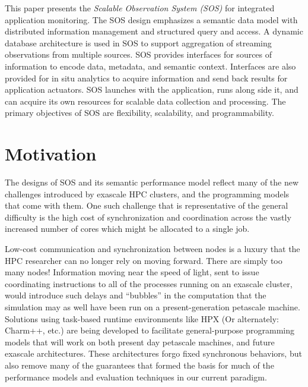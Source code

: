 This paper presents the \textit{Scalable Observation System (SOS)} for
integrated application monitoring.  The SOS design emphasizes a semantic
data model with distributed information management and structured query and
access.  A dynamic database architecture is used in SOS to support
aggregation of streaming observations from multiple sources.  SOS provides
interfaces for sources of information to encode data, metadata, and
semantic context.  Interfaces are also provided for in situ analytics to
acquire information and send back results for application actuators.  SOS
launches with the application, runs along side it, and can acquire its own
resources for scalable data collection and processing.  The primary
objectives of SOS are flexibility, scalability, and programmability.


\section{Motivation}

The designs of SOS and its semantic performance model reflect many of
the new challenges introduced by exascale HPC clusters, and the
programming models that come with them. One such challenge that is
representative of the general difficulty is the high cost of
synchronization and coordination across the vastly increased number of
cores which might be allocated to a single job.

Low-cost communication and synchronization between nodes is a luxury
that the HPC researcher can no longer rely on moving forward. There
are simply too many nodes! Information moving near the speed of light,
sent to issue coordinating instructions to all of the processes
running on an exascale cluster, would introduce such delays and
``bubbles'' in the computation that the simulation may as well have
been run on a present-generation petascale machine.  Solutions using
task-based runtime environments \cite{kaiser2014hpx} like HPX (Or
alternately: Charm++, etc.)  are being developed to facilitate
general-purpose programming models that will work on both present day
petascale machines, and future exascale architectures. These
architectures forgo fixed synchronous behaviors, but also remove many
of the guarantees that formed the basis for much of the performance
models and evaluation techniques in our current paradigm.

